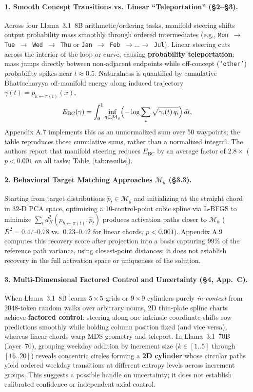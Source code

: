 \documentclass[10pt,a4paper]{article}
\newcommand{\Mh}{\mathcal{M}_h}
\newcommand{\My}{\mathcal{M}_y}
\begin{document}
\paragraph{1. Smooth Concept Transitions vs.\ Linear ``Teleportation'' (\S2--\S3).}
Across four Llama~3.1~8B arithmetic/ordering tasks, manifold steering shifts output probability mass smoothly through ordered intermediates (e.g., \texttt{Mon $\to$ Tue $\to$ Wed $\to$ Thu} or \texttt{Jan $\to$ Feb $\to \dots \to$ Jul}). Linear steering cuts across the interior of the loop or curve, causing \textbf{probability teleportation}: mass jumps directly between non-adjacent endpoints while off-concept (\texttt{`other'}) probability spikes near $t \approx 0.5$. Naturalness is quantified by cumulative Bhattacharyya off-manifold energy along induced trajectory $\gamma(t) = p_{h \leftarrow \pi(t)}(x)$,
\begin{equation}
    E_{\mathrm{BC}}(\gamma) = \int_0^1 \inf_{q \in \My} \Bigl(-\log \sum_i \sqrt{\gamma_i(t)\, q_i}\Bigr)\,dt,
\end{equation}
Appendix A.7 implements this as an unnormalized sum over 50 waypoints; the table reproduces those cumulative sums, rather than a normalized integral. The authors report that manifold steering reduces $E_{\mathrm{BC}}$ by an average factor of \textbf{$2.8\times$} ($p < 0.001$ on all tasks; Table~\ref{tab:results}).

\paragraph{2. Behavioral Target Matching Approaches $\Mh$ (\S3.3).}
Starting from target distributions $\hat{p}_t \in \My$ and initializing at the straight chord in 32-D PCA space, optimizing a 10-control-point cubic spline via L-BFGS to minimize $\sum_t d_H^2(p_{h \leftarrow \pi(t)}, \hat{p}_t)$ produces activation paths closer to $\Mh$ ($R^2 = 0.47\text{--}0.78$ vs.\ $0.23\text{--}0.42$ for linear chords, $p < 0.001$). Appendix A.9 computes this recovery score after projection into a basis capturing 99\% of the reference path variance, using closest-point distances; it does not establish recovery in the full activation space or uniqueness of the solution.

\paragraph{3. Multi-Dimensional Factored Control and Uncertainty (\S4, App.\ C).}
When Llama~3.1~8B learns $5 \times 5$ grids or $9 \times 9$ cylinders purely \emph{in-context} from 2048-token random walks over arbitrary nouns, 2D thin-plate spline charts achieve \textbf{factored control}: steering along one intrinsic coordinate shifts row predictions smoothly while holding column position fixed (and vice versa), whereas linear chords warp MDS geometry and teleport. In Llama~3.1~70B (layer~70), grouping weekday addition by increment size ($k \in [1..5]$ through $[16..20]$) reveals concentric circles forming a \textbf{2D cylinder} whose circular paths yield ordered weekday transitions at different entropy levels across increment groups. This suggests a possible handle on uncertainty; it does not establish calibrated confidence or independent axial control.
\end{document}
